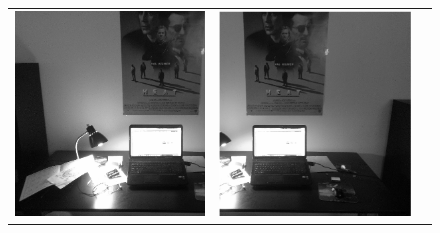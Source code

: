 \documentclass[11pt]{article} %
\begin{document}
\begin{figure}[H]
\centering
	\begin{tabular}{ccc}
			\includegraphics[scale=.20]{figures/room_l} & 
			\includegraphics[scale=.20]{figures/room_r} &

\end{tabular}
\end{figure}
\end{document}
